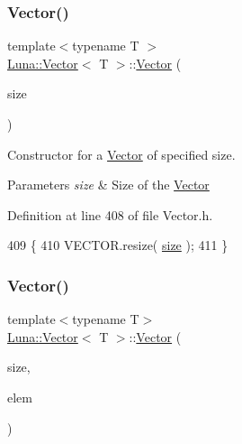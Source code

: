 \subsubsection{\texorpdfstring{Vector()}{Vector()}\hspace{0.1cm}{\footnotesize\ttfamily [2/5]}}
{\footnotesize\ttfamily template$<$typename T $>$ \\
\hyperlink{classLuna_1_1Vector}{Luna\+::\+Vector}$<$ T $>$\+::\hyperlink{classLuna_1_1Vector}{Vector} (\begin{DoxyParamCaption}\item[{const std\+::size\+\_\+t \&}]{size }\end{DoxyParamCaption})\hspace{0.3cm}{\ttfamily [inline]}}



Constructor for a \hyperlink{classLuna_1_1Vector}{Vector} of specified size. 


\begin{DoxyParams}{Parameters}
{\em size} & Size of the \hyperlink{classLuna_1_1Vector}{Vector} \\
\hline
\end{DoxyParams}


Definition at line 408 of file Vector.\+h.


\begin{DoxyCode}
409   \{
410     VECTOR.resize( \hyperlink{classLuna_1_1Vector_ac9b6ed7a0df401728f27c193fbc8f4d8}{size} );
411   \}
\end{DoxyCode}
\mbox{\label{classLuna_1_1Vector_a0041d60c76553a0d51a2c5c7b9df557f}} 
\subsubsection{\texorpdfstring{Vector()}{Vector()}\hspace{0.1cm}{\footnotesize\ttfamily [3/5]}}
{\footnotesize\ttfamily template$<$typename T$>$ \\
\hyperlink{classLuna_1_1Vector}{Luna\+::\+Vector}$<$ T $>$\+::\hyperlink{classLuna_1_1Vector}{Vector} (\begin{DoxyParamCaption}\item[{const std\+::size\+\_\+t \&}]{size,  }\item[{const T \&}]{elem }\end{DoxyParamCaption})\hspace{0.3cm}{\ttfamily [inline]}}



